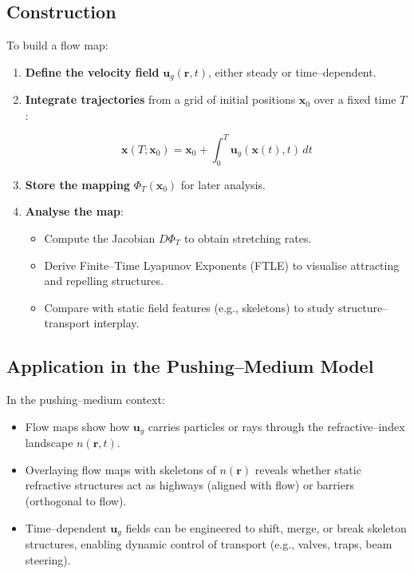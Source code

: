 \documentclass{article}
\begin{document}
\subsection*{Construction}
To build a flow map:
\begin{enumerate}
    \item \textbf{Define the velocity field} $\mathbf{u}_g(\mathbf{r},t)$, either steady or time--dependent.
    \item \textbf{Integrate trajectories} from a grid of initial positions $\mathbf{x}_0$ over a fixed time $T$:

\[
    \mathbf{x}(T; \mathbf{x}_0) = \mathbf{x}_0 + \int_0^T \mathbf{u}_g(\mathbf{x}(t), t) \, dt
\]

    \item \textbf{Store the mapping} $\Phi_T(\mathbf{x}_0)$ for later analysis.
    \item \textbf{Analyse the map}: 
    \begin{itemize}
        \item Compute the Jacobian $D\Phi_T$ to obtain stretching rates.
        \item Derive Finite--Time Lyapunov Exponents (FTLE) to visualise attracting and repelling structures.
        \item Compare with static field features (e.g., skeletons) to study structure--transport interplay.
    \end{itemize}
\end{enumerate}

\subsection*{Application in the Pushing--Medium Model}
In the pushing--medium context:
\begin{itemize}
    \item Flow maps show how $\mathbf{u}_g$ carries particles or rays through the refractive--index landscape $n(\mathbf{r},t)$.
    \item Overlaying flow maps with skeletons of $n(\mathbf{r})$ reveals whether static refractive structures act as highways (aligned with flow) or barriers (orthogonal to flow).
    \item Time--dependent $\mathbf{u}_g$ fields can be engineered to shift, merge, or break skeleton structures, enabling dynamic control of transport (e.g., valves, traps, beam steering).
\end{itemize}
\end{document}
